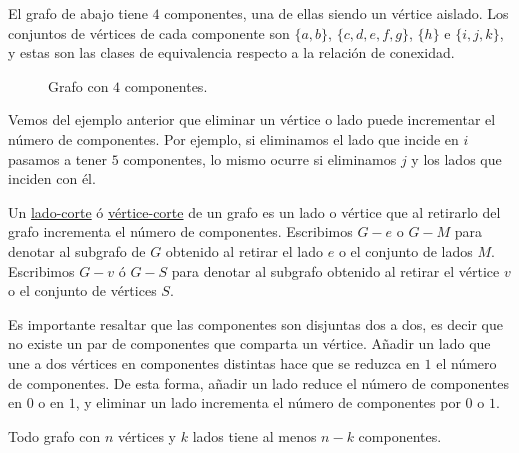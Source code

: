 \begin{ejem}\label{ejem:cortes}
    El grafo de abajo tiene $4$ componentes, una de ellas siendo un vértice aislado. Los conjuntos de vértices de cada componente son $\{a,b\}$, $\{c,d,e,f,g\}$, $\{h\}$ e $\{i,j,k\}$, y estas son las clases de equivalencia respecto a la relación de conexidad.
    
    \begin{figure}
        \centering
        \caption{Grafo con $4$ componentes.}
    \end{figure}
\end{ejem}

Vemos del ejemplo anterior que eliminar un vértice o lado puede incrementar el número de componentes. Por ejemplo, si eliminamos el lado que incide en $i$ pasamos a tener $5$ componentes, lo mismo ocurre si eliminamos $j$ y los lados que inciden con él.

\begin{defn}
    Un \ul{lado-corte} ó \ul{vértice-corte} de un grafo es un lado o vértice que al retirarlo del grafo incrementa el número de componentes. Escribimos $G - e$ o $G - M$ para denotar al subgrafo de $G$ obtenido al retirar el lado $e$ o el conjunto de lados $M$. Escribimos $G - v$ ó $G - S$ para denotar al subgrafo obtenido al retirar el vértice $v$ o el conjunto de vértices $S$.
\end{defn}

Es importante resaltar que las componentes son disjuntas dos a dos, es decir que no existe un par de componentes que comparta un vértice. Añadir un lado que une a dos vértices en componentes distintas hace que se reduzca en $1$ el número de componentes. De esta forma, añadir un lado reduce el número de componentes en $0$ o en $1$, y eliminar un lado incrementa el número de componentes por $0$ o $1$.

\begin{pro}
    Todo grafo con $n$ vértices y $k$ lados tiene al menos $n-k$ componentes.
\end{pro}

